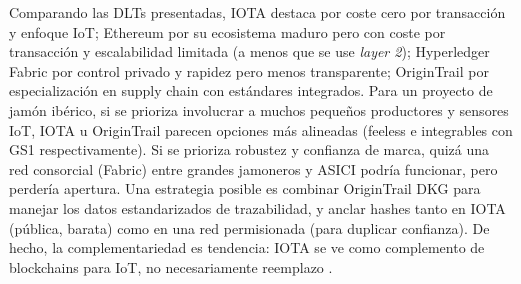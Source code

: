 Comparando las DLTs presentadas, IOTA destaca por coste cero por transacción y enfoque IoT; Ethereum por su ecosistema maduro pero con coste por transacción y escalabilidad limitada (a menos que se use \textit{layer 2}); Hyperledger Fabric por control privado y rapidez pero menos transparente; OriginTrail por especialización en supply chain con estándares integrados. Para un proyecto de jamón ibérico, si se prioriza involucrar a muchos pequeños productores y sensores IoT, IOTA u OriginTrail parecen opciones más alineadas (feeless e integrables con GS1 respectivamente). Si se prioriza robustez y confianza de marca, quizá una red consorcial (Fabric) entre grandes jamoneros y ASICI podría funcionar, pero perdería apertura. Una estrategia posible es combinar OriginTrail DKG para manejar los datos estandarizados de trazabilidad, y anclar hashes tanto en IOTA (pública, barata) como en una red permisionada (para duplicar confianza). De hecho, la complementariedad es tendencia: IOTA se ve como complemento de blockchains para IoT, no necesariamente reemplazo \cite{pullo_integrating_2024}.